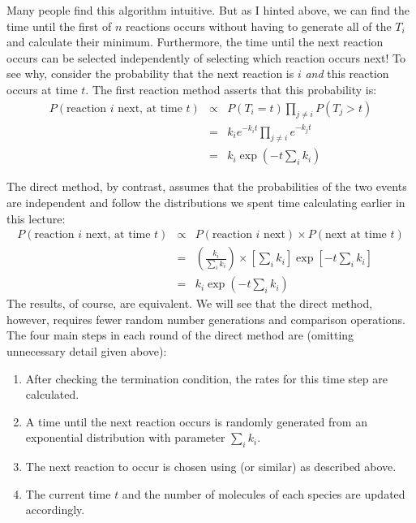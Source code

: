 \documentclass{article}
\begin{document}
Many people find this algorithm intuitive. But as I hinted above, we can find the time until the first of $n$ reactions occurs without having to generate all of the $T_i$ and calculate their minimum. Furthermore, the time until the next reaction occurs can be selected independently of selecting which reaction occurs next! To see why, consider the probability that the next reaction is $i$ \textit{and} this reaction occurs at time $t$. The first reaction method asserts that this probability is:
\begin{eqnarray*}
P(\textrm{reaction $i$ next, at time $t$}) & \propto & P(T_i = t)  \prod_{j\neq i} P(T_j > t)\\
& = & k_i e^{-k_i t}   \prod_{j\neq i} e^{-k_j t}\\
& = & k_i \exp \left(-t \sum_i k_i \right)
\end{eqnarray*}

The direct method, by contrast, assumes that the probabilities of the two events are independent and follow the distributions we spent time calculating earlier in this lecture:
\begin{eqnarray*}
P(\textrm{reaction $i$ next, at time $t$}) & \propto & P(\textrm{reaction $i$ next}) \times P(\textrm{next at time $t$})\\
& = & \left( \frac{k_i}{\sum_i k_i} \right) \times \left[ \sum_i k_i \right] \exp \left[ -t \sum_i k_i\right] \\
& = & k_i \exp \left(-t \sum_i k_i \right)
\end{eqnarray*}
The results, of course, are equivalent. We will see that the direct method, however, requires fewer random number generations and comparison operations. The four main steps in each round of the direct method are (omitting unnecessary detail given above):
\begin{enumerate}
\item After checking the termination condition, the rates for this time step are calculated.
\item A time until the next reaction occurs is randomly generated from an exponential distribution with parameter $\sum_i k_i$.
\item The next reaction to occur is chosen using  (or similar) as described above.
\item The current time $t$ and the number of molecules of each species are updated accordingly.
\end{enumerate}
\end{document}

